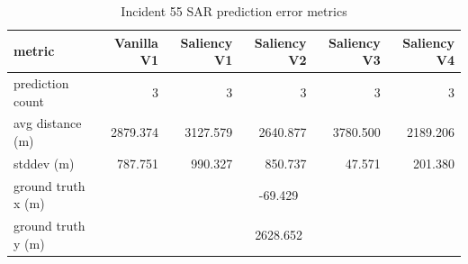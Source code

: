 \begin{table}[ht]
\centering
\caption{Incident 55 SAR prediction error metrics}
\label{tab:sar-incident-55}
\begin{tabular}{lrrrrr}
\hline
metric & Vanilla V1 & Saliency V1 & Saliency V2 & Saliency V3 & Saliency V4 \\
\hline
prediction count & 3 & 3 & 3 & 3 & 3 \\
avg distance (m) & 2879.374 & 3127.579 & 2640.877 & 3780.500 & 2189.206 \\
stddev (m) & 787.751 & 990.327 & 850.737 & 47.571 & 201.380 \\
ground truth x (m) & \multicolumn{5}{c}{-69.429} \\
ground truth y (m) & \multicolumn{5}{c}{2628.652} \\
\hline
\end{tabular}
\end{table}
